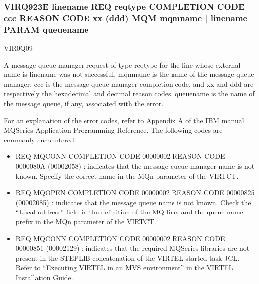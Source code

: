 \documentclass[letterpaper,10pt,english]{sphinxmanual}
\begin{document}
\subsubsection{VIRQ923E linename REQ reqtype COMPLETION CODE ccc REASON CODE xx (ddd) MQM mqmname | linename PARAM queuename}
\label{\detokenize{messages:virq923e-linename-req-reqtype-completion-code-ccc-reason-code-xx-ddd-mqm-mqmname-linename-param-queuename}}\begin{description}
\sphinxAtStartPar
VIR0Q09

\sphinxAtStartPar
A message queue manager request of type reqtype for the line whose external name is linename was not successful. mqmname is the name of the message queue manager, ccc is the message queue manager completion code, and xx and ddd are respectively the hexadecimal and decimal reason codes. queuename is the name of the message queue, if any, associated with the error.

\sphinxAtStartPar
For an explanation of the error codes, refer to Appendix A of the IBM manual MQSeries Application Programming Reference.
The following codes are commonly encountered:
\begin{itemize}
\item {} 
\sphinxAtStartPar
REQ MQCONN COMPLETION CODE 00000002 REASON CODE 0000080A (00002058) : indicates that the message queue manager name is not known. Specify the correct name in the MQn parameter of the VIRTCT.

\item {} 
\sphinxAtStartPar
REQ MQOPEN COMPLETION CODE 00000002 REASON CODE 00000825 (00002085) : indicates that the message queue name is not known. Check the “Local address” field in the definition of the MQ line, and the queue name prefix in the MQn parameter of the VIRTCT.

\item {} 
\sphinxAtStartPar
REQ MQCONN COMPLETION CODE 00000002 REASON CODE 00000851 (00002129) : indicates that the required MQSeries libraries are not present in the STEPLIB concatenation of the VIRTEL started task JCL. Refer to “Executing VIRTEL in an MVS environment” in the VIRTEL Installation Guide.

\end{itemize}

\end{description}
\end{document}
